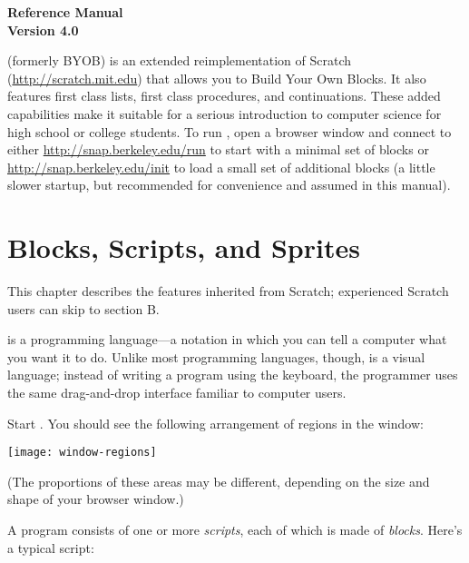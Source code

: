 \documentclass{report}
\begin{document}
\begin{titlepage}

\begin{center}
\bf \Huge \Snap{} Reference Manual \\
\huge Version 4.0
\vspace{40pt}
\end{center}

\Snap{} (formerly BYOB) is an extended reimplementation of Scratch (\url{http://scratch.mit.edu}) that allows you to Build Your Own Blocks. It also features first class lists, first class procedures, and continuations. These added capabilities make it suitable for a serious introduction to computer science for high school or college students.  To run \Snap{}, open a browser window and connect to either \url{http://snap.berkeley.edu/run} to start with a minimal set of blocks or \url{http://snap.berkeley.edu/init} to load a small set of additional blocks (a little slower startup, but recommended for convenience and assumed in this manual).

\end{titlepage}

\chapter{Blocks, Scripts, and Sprites}

This chapter describes the \Snap{} features inherited from Scratch; experienced Scratch users can skip to section B.

\Snap{} is a programming language---a notation in which you can tell a computer what you want it to do. Unlike most programming languages, though, \Snap{} is a visual language; instead of writing a program using the keyboard, the \Snap{} programmer uses the same drag-and-drop interface familiar to computer users.

Start \Snap{}. You should see the following arrangement of regions in the window:

\begin{center}
\texttt{[image: window-regions]}
\end{center}

(The proportions of these areas may be different, depending on the size and shape of your browser window.)

A \Snap{} program consists of one or more \emph{scripts}, each of which is made of \emph{blocks}. Here's a typical script:

\end{document}
